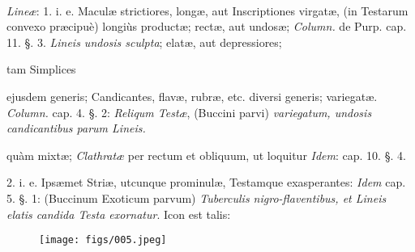 \documentclass[a4paper, 11pt, oneside, polutonikogreek, german]{article}
\begin{document}
\paragraph{}
\emph{Lineæ}: 1. i. e. Maculæ strictiores, longæ, aut Inscriptiones virgatæ, (in Testarum convexo præcipuè) longiùs productæ; rectæ, aut undosæ; \emph{Column.} de Purp. cap. 11. §. 3. \emph{Lineis undosis sculpta}; elatæ, aut depressiores;

tam Simplices

ejusdem generis; Candicantes, flavæ, rubræ, etc. diversi generis; variegatæ. \emph{Column.} cap. 4. §. 2: \emph{Reliqum Testæ}, (Buccini parvi) \emph{variegatum, undosis candicantibus parum Lineis.}

quàm mixtæ; \emph{Clathratæ} per rectum et obliquum, ut loquitur \emph{Idem}: cap. 10. §. 4.

2. i. e. Ipsæmet Striæ, utcunque prominulæ, Testamque exasperantes: \emph{Idem} cap. 5. §. 1: (Buccinum Exoticum parvum) \emph{Tuberculis nigro-flaventibus, et Lineis elatis candida Testa exornatur}. Icon est talis:

\begin{figure}[H]
\centering
\texttt{[image: figs/005.jpeg]}
\end{figure}
\end{document}
